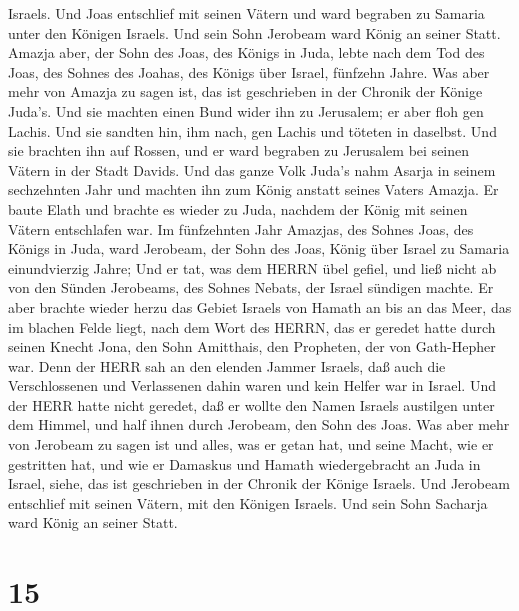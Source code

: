 Israels.  Und Joas entschlief mit seinen Vätern und ward
begraben zu Samaria unter den Königen Israels. Und sein Sohn Jerobeam
ward König an seiner Statt.  Amazja aber, der Sohn des
Joas, des Königs in Juda, lebte nach dem Tod des Joas, des Sohnes des
Joahas, des Königs über Israel, fünfzehn Jahre.  Was aber
mehr von Amazja zu sagen ist, das ist geschrieben in der Chronik der
Könige Juda's.  Und sie machten einen Bund wider ihn zu
Jerusalem; er aber floh gen Lachis. Und sie sandten hin, ihm nach, gen
Lachis und töteten in daselbst.  Und sie brachten ihn auf
Rossen, und er ward begraben zu Jerusalem bei seinen Vätern in der Stadt
Davids.  Und das ganze Volk Juda's nahm Asarja in seinem
sechzehnten Jahr und machten ihn zum König anstatt seines Vaters Amazja.
 Er baute Elath und brachte es wieder zu Juda, nachdem der
König mit seinen Vätern entschlafen war.  Im fünfzehnten
Jahr Amazjas, des Sohnes Joas, des Königs in Juda, ward Jerobeam, der
Sohn des Joas, König über Israel zu Samaria einundvierzig Jahre;
 Und er tat, was dem HERRN übel gefiel, und ließ nicht ab
von den Sünden Jerobeams, des Sohnes Nebats, der Israel sündigen machte.
 Er aber brachte wieder herzu das Gebiet Israels von Hamath
an bis an das Meer, das im blachen Felde liegt, nach dem Wort des HERRN,
das er geredet hatte durch seinen Knecht Jona, den Sohn Amitthais, den
Propheten, der von Gath-Hepher war.  Denn der HERR sah an
den elenden Jammer Israels, daß auch die Verschlossenen und Verlassenen
dahin waren und kein Helfer war in Israel.  Und der HERR
hatte nicht geredet, daß er wollte den Namen Israels austilgen unter dem
Himmel, und half ihnen durch Jerobeam, den Sohn des Joas. 
Was aber mehr von Jerobeam zu sagen ist und alles, was er getan hat, und
seine Macht, wie er gestritten hat, und wie er Damaskus und Hamath
wiedergebracht an Juda in Israel, siehe, das ist geschrieben in der
Chronik der Könige Israels.  Und Jerobeam entschlief mit
seinen Vätern, mit den Königen Israels. Und sein Sohn Sacharja ward
König an seiner Statt.

\hypertarget{section-14}{%
\section{15}\label{section-14}}


